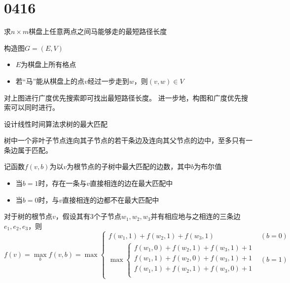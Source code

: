 \documentclass[answers]{exam}
\begin{document}

\section{0416}\label{sec:0416}
\begin{questions}\label{qset:0416}

    \question 求$n \times m$棋盘上任意两点之间马能够走的最短路径长度

    \begin{solution}
        构造图$G=(E,V)$\begin{itemize}
            \item $E$为棋盘上所有格点
            \item 若“马”能从棋盘上的点$v$经过一步走到$w$，则$(v,w) \in V$
        \end{itemize}

        对上图进行广度优先搜索即可找出最短路径长度。
        进一步地，构图和广度优先搜索可以同时进行。

    \end{solution}

    \question 设计线性时间算法求树的最大匹配

    \begin{solution}
        树中一个非叶子节点连向其子节点的若干条边及连向其父节点的边中，至多只有一条边属于匹配。

        记函数$f(v, b)$为以$v$为根节点的子树中最大匹配的边数，其中$b$为布尔值\begin{itemize}
            \item 当$b=1$时，存在一条与$v$直接相连的边在最大匹配中
            \item 当$b=0$时，与$v$直接相连的边都不在最大匹配中
        \end{itemize}

        对于树的根节点$v$，假设其有3个子节点$w_1,w_2,w_3$并有相应地与之相连的三条边$e_1, e_2, e_3$，则
        \[
            f(v) = \max_b {f(v,b)} = \max \begin{cases}
                f(w_1,1) + f(w_2,1) + f(w_3,1) & (b=0) \\
                \max \begin{cases}
                    f(w_1,0) + f(w_2,1) + f(w_3,1) + 1 \\
                    f(w_1,1) + f(w_2,0) + f(w_3,1) + 1 \\
                    f(w_1,1) + f(w_2,1) + f(w_3,0) + 1 \\
                \end{cases} & (b=1)
            \end{cases}
        \]


\end{solution}
\end{questions}
\end{document}
